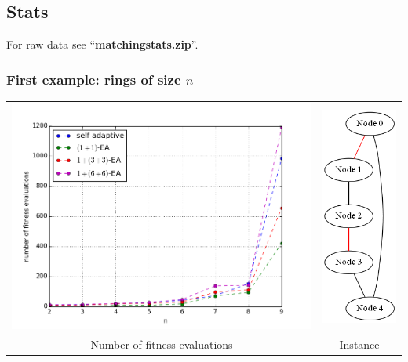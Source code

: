 \documentclass{article}
\newcommand{\Stats}{\subsection{Stats}}
\begin{document}
\Stats

For raw data see "`\textbf{matchingstats.zip}"'.

\subsubsection{First example: rings of size $n$}

\begin{tabular}{cc} 
	\includegraphics[scale=0.5]{img/stat_matching_1.png} & \includegraphics[scale=0.5]{img/max_graph.png} \\
	Number of fitness evaluations  & Instance
\end{tabular}
\end{document}
